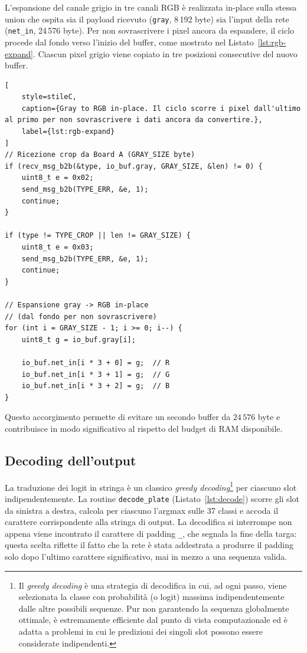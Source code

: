L'espansione del canale grigio in tre canali RGB è realizzata in-place sulla stessa union che ospita sia il payload ricevuto (\texttt{gray}, 8\,192 byte) sia l'input della rete (\texttt{net\_in}, 24\,576 byte). Per non sovrascrivere i pixel ancora da espandere, il ciclo procede dal fondo verso l'inizio del buffer, come mostrato nel Listato~\ref{lst:rgb-expand}. Ciascun pixel grigio viene copiato in tre posizioni consecutive del nuovo buffer.

\begin{lstlisting}[
    style=stileC,
    caption={Gray to RGB in-place. Il ciclo scorre i pixel dall'ultimo al primo per non sovrascrivere i dati ancora da convertire.},
    label={lst:rgb-expand}
]
// Ricezione crop da Board A (GRAY_SIZE byte)
if (recv_msg_b2b(&type, io_buf.gray, GRAY_SIZE, &len) != 0) {
    uint8_t e = 0x02;
    send_msg_b2b(TYPE_ERR, &e, 1);
    continue;
}

if (type != TYPE_CROP || len != GRAY_SIZE) {
    uint8_t e = 0x03;
    send_msg_b2b(TYPE_ERR, &e, 1);
    continue;
}

// Espansione gray -> RGB in-place
// (dal fondo per non sovrascrivere)
for (int i = GRAY_SIZE - 1; i >= 0; i--) {
    uint8_t g = io_buf.gray[i];

    io_buf.net_in[i * 3 + 0] = g;  // R
    io_buf.net_in[i * 3 + 1] = g;  // G
    io_buf.net_in[i * 3 + 2] = g;  // B
}
\end{lstlisting}

Questo accorgimento permette di evitare un secondo buffer da $24\,576$ byte e contribuisce in modo significativo al rispetto del budget di RAM disponibile.

\subsection{Decoding dell'output}
\label{sec:decoding}

La traduzione dei logit in stringa è un classico \textit{greedy decoding}\footnote{Il \textit{greedy decoding} è una strategia di decodifica in cui, ad ogni passo, viene selezionata la classe con probabilità (o logit) massima indipendentemente dalle altre possibili sequenze. Pur non garantendo la sequenza globalmente ottimale, è estremamente efficiente dal punto di vista computazionale ed è adatta a problemi in cui le predizioni dei singoli slot possono essere considerate indipendenti.} per ciascuno slot indipendentemente. La routine \texttt{decode\_plate} (Listato~\ref{lst:decode}) scorre gli slot da sinistra a destra, calcola per ciascuno l'argmax sulle 37 classi e accoda il carattere corrispondente alla stringa di output. La decodifica si interrompe non appena viene incontrato il carattere di padding \texttt{\_}, che segnala la fine della targa: questa scelta riflette il fatto che la rete è stata addestrata a produrre il padding solo dopo l'ultimo carattere significativo, mai in mezzo a una sequenza valida.

